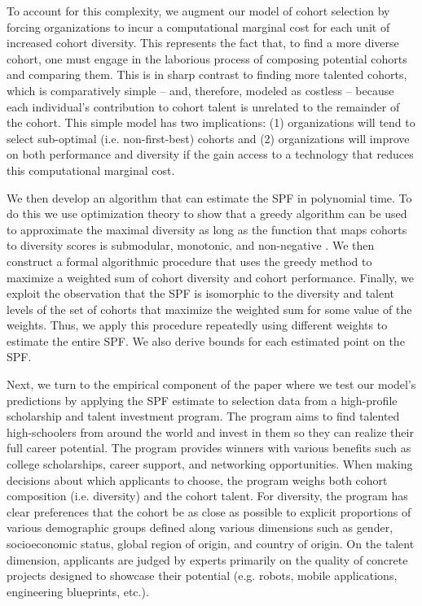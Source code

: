 To account for this complexity, we augment our model of cohort selection by forcing organizations to incur a computational marginal cost for each unit of increased cohort diversity. This represents the fact that, to find a more diverse cohort, one must engage in the laborious process of composing potential cohorts and comparing them. This is in sharp contrast to finding more talented cohorts, which is comparatively simple -- and, therefore, modeled as costless -- because each individual's contribution to cohort talent is unrelated to the remainder of the cohort. This simple model has two implications: (1) organizations will tend to select sub-optimal (i.e. non-first-best) cohorts and (2) organizations will improve on both performance and diversity if the gain access to a technology that reduces this computational marginal cost. 

We then develop an algorithm that can estimate the SPF in polynomial time. To do this we use optimization theory to show that a greedy algorithm can be used to approximate the maximal diversity as long as the function that maps cohorts to diversity scores is submodular, monotonic, and non-negative \cite{krause2014submodular, huppenkothen2020entrofy}. We then construct a formal algorithmic procedure that uses the greedy method to maximize a weighted sum of cohort diversity and cohort performance. Finally, we exploit the observation that the SPF is isomorphic to the diversity and talent levels of the set of cohorts that maximize the weighted sum for some value of the weights. Thus, we apply this procedure repeatedly using different weights to estimate the entire SPF. We also derive bounds for each estimated point on the SPF. 

Next, we turn to the empirical component of the paper where we test our model's predictions by applying the SPF estimate to selection data from a high-profile scholarship and talent investment program. The program aims to find talented high-schoolers from around the world and invest in them so they can realize their full career potential. The program provides winners with various benefits such as college scholarships, career support, and networking opportunities. When making decisions about which applicants to choose, the program weighs both cohort composition (i.e. diversity) and the cohort talent. For diversity, the program has clear preferences that the cohort be as close as possible to explicit proportions of various demographic groups defined along various dimensions such as gender, socioeconomic status, global region of origin, and country of origin. On the talent dimension, applicants are judged by experts primarily on the quality of concrete projects designed to showcase their potential (e.g. robots, mobile applications, engineering blueprints, etc.).

